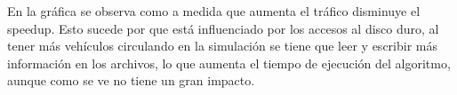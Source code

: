 En la gráfica se observa como a medida que aumenta el tráfico disminuye el speedup. Esto sucede por que está influenciado por los accesos al disco duro, al tener más vehículos circulando en la simulación se tiene que leer y escribir más información en los archivos, lo que aumenta el tiempo de ejecución del algoritmo, aunque como se ve no tiene un gran impacto.